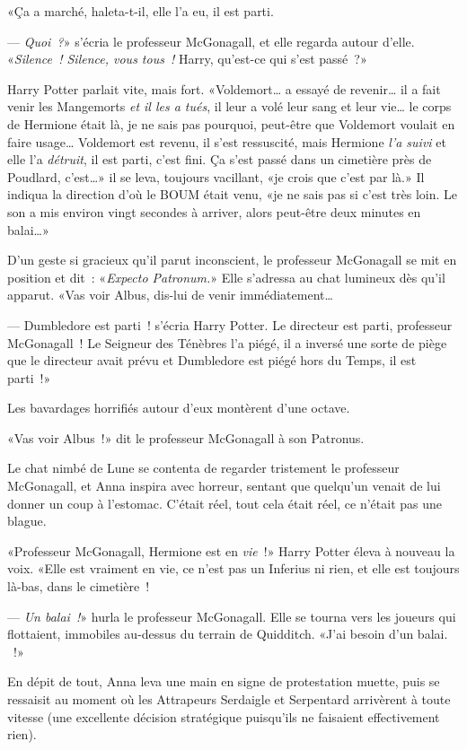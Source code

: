 «Ça a marché, haleta-t-il, elle l'a eu, il est parti.

--- \emph{Quoi~?}» s'écria le professeur McGonagall, et elle regarda autour d'elle. «\emph{Silence~! Silence, vous tous~!} Harry, qu'est-ce qui s'est passé~?»

Harry Potter parlait vite, mais fort. «Voldemort… a essayé de revenir… il a fait venir les Mangemorts \emph{et il les a tués}, il leur a volé leur sang et leur vie… le corps de Hermione était là, je ne sais pas pourquoi, peut-être que Voldemort voulait en faire usage… Voldemort est revenu, il s'est ressuscité, mais Hermione \emph{l'a suivi} et elle l'a \emph{détruit}, il est parti, c'est fini. Ça s'est passé dans un cimetière près de Poudlard, c'est…» il se leva, toujours vacillant, «je crois que c'est par là.» Il indiqua la direction d'où le BOUM était venu, «je ne sais pas si c'est très loin. Le son a mis environ vingt secondes à arriver, alors peut-être deux minutes en balai…»

D'un geste si gracieux qu'il parut inconscient, le professeur McGonagall se mit en position et dit~: «\emph{Expecto Patronum.}» Elle s'adressa au chat lumineux dès qu'il apparut. «Vas voir Albus, dis-lui de venir immédiatement…

--- Dumbledore est parti~! s'écria Harry Potter. Le directeur est parti, professeur McGonagall~! Le Seigneur des Ténèbres l'a piégé, il a inversé une sorte de piège que le directeur avait prévu et Dumbledore est piégé hors du Temps, il est parti~!»

Les bavardages horrifiés autour d'eux montèrent d'une octave.

«Vas voir Albus~!» dit le professeur McGonagall à son Patronus.

Le chat nimbé de Lune se contenta de regarder tristement le professeur McGonagall, et Anna inspira avec horreur, sentant que quelqu'un venait de lui donner un coup à l'estomac. C'était réel, tout cela était réel, ce n'était pas une blague.

«Professeur McGonagall, Hermione est en \emph{vie}~!» Harry Potter éleva à nouveau la voix. «Elle est vraiment en vie, ce n'est pas un Inferius ni rien, et elle est toujours là-bas, dans le cimetière~!

--- \emph{Un balai~!}» hurla le professeur McGonagall. Elle se tourna vers les joueurs qui flottaient, immobiles au-dessus du terrain de Quidditch. «J'ai besoin d'un balai. ~!»

En dépit de tout, Anna leva une main en signe de protestation muette, puis se ressaisit au moment où les Attrapeurs Serdaigle et Serpentard arrivèrent à toute vitesse (une excellente décision stratégique puisqu'ils ne faisaient effectivement rien).

